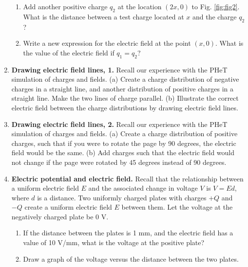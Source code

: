 \documentclass[10pt]{article}
\begin{document}
\begin{enumerate}
\begin{enumerate}
\item Add another positive charge $q_2$ at the location $(2x,0)$ to Fig. \ref{fig:fig2}.  What is the distance between a test charge located at $x$ and the charge $q_2$? \\ \vspace{1cm}
\item Write a new expression for the electric field at the point $(x,0)$.  What is the value of the electric field if $q_1 = q_2$? \\ \vspace{2cm}
\end{enumerate}
\item \textbf{Drawing electric field lines, 1.} Recall our experience with the PHeT simulation of charges and fields.  (a) Create a charge distribution of negative charges in a straight line, and another distribution of positive charges in a straight line.  Make the two lines of charge parallel. (b) Illustrate the correct electric field between the charge distributions by drawing electric field lines. \\ \vspace{4cm}
\item \textbf{Drawing electric field lines, 2.} Recall our experience with the PHeT simulation of charges and fields.  (a) Create a charge distribution of positive charges, such that if you were to rotate the page by 90 degrees, the electric field would be the same.  (b) Add charges such that the electric field would not change if the page were rotated by 45 degrees instead of 90 degrees.  \\ \vspace{4cm}
\item \textbf{Electric potential and electric field.} Recall that the relationship between a uniform electric field $E$ and the associated change in voltage $V$ is $V = Ed$, where $d$ is a distance.  Two uniformly charged plates with charges $+Q$ and $-Q$ create a uniform electric field $E$ between them.  Let the voltage at the negatively charged plate be 0 V.
\begin{enumerate}
\item 	If the distance between the plates is 1 mm, and the electric field has a value of 10 V/mm, what is the voltage at the positive plate? \\ \vspace{1cm}
\item Draw a graph of the voltage versus the distance between the two plates. \\ \vspace{3cm}

\end{enumerate}
\end{enumerate}
\end{document}
